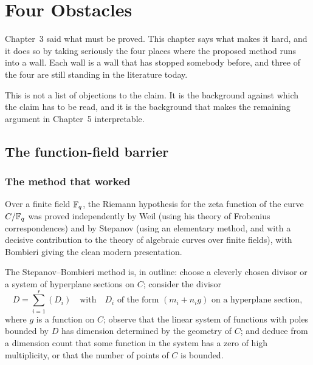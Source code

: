 
\chapter{Four Obstacles}
\label{ch:barriers}

Chapter~3 said what must be proved. This chapter says what makes it hard, and
it does so by taking seriously the four places where the proposed method runs
into a wall. Each wall is a wall that has stopped somebody before, and three
of the four are still standing in the literature today.

This is not a list of objections to the claim. It is the background against
which the claim has to be read, and it is the background that makes the
remaining argument in Chapter~5 interpretable.

\section{The function-field barrier}\subsection{The method that worked}Over a finite field $\mathbb{F}_q$, the Riemann hypothesis for the zeta function of
the curve $C/\mathbb{F}_q$ was proved independently by Weil (using his theory of
Frobenius correspondences) and by Stepanov (using an elementary method, and
with a decisive contribution to the theory of algebraic curves over finite
fields), with Bombieri giving the clean modern presentation.

The Stepanov--Bombieri method is, in outline: choose a cleverly chosen divisor
or a system of hyperplane sections on $C$; consider the divisor
\begin{equation}
D = \sum_{i=1}^{r} (D_i) \quad\text{with}\quad D_i \text{ of the form }
       (m_i + n_i g) \text{ on a hyperplane section},
\label{eq:stepanov}
\end{equation}
where $g$ is a function on $C$; observe that the linear system of functions
with poles bounded by $D$ has dimension determined by the geometry of $C$; and
deduce from a dimension count that some function in the system has a zero of
high multiplicity, or that the number of points of $C$ is bounded.

